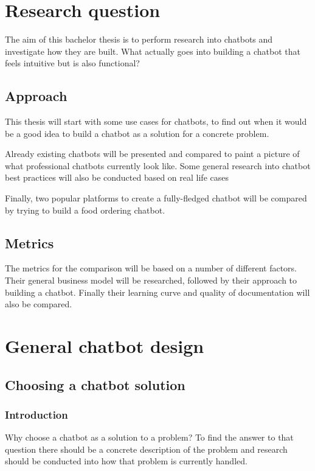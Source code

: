 \chapter{Research question}

The aim of this bachelor thesis is to perform research into chatbots and investigate how they are built. What actually goes into building a chatbot that feels intuitive but is also functional?

\section{Approach}

This thesis will start with some use cases for chatbots, to find out when it would be a good idea to build a chatbot as a solution for a concrete problem.

Already existing chatbots will be presented and compared to paint a picture of what professional chatbots currently look like.
Some general research into chatbot best practices will also be conducted based on real life cases

Finally, two popular platforms to create a fully-fledged chatbot will be compared by trying to build a food ordering chatbot.

\section{Metrics}

The metrics for the comparison will be based on a number of different factors. Their general business model will be researched, followed by their approach to building a chatbot. Finally their learning curve and quality of documentation will also be compared.

\chapter{General chatbot design}

\section{Choosing a chatbot solution}

\subsection{Introduction}

Why choose a chatbot as a solution to a problem? To find the answer to that question there should be a concrete description of the problem and research should be conducted into how that problem is currently handled.


